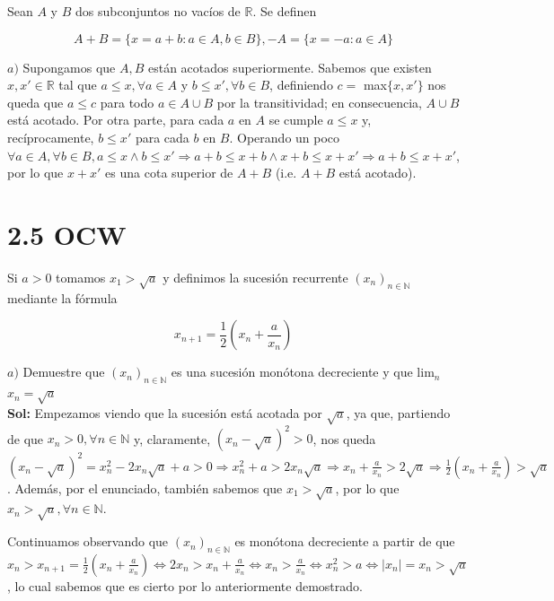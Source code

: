\documentclass{article}
\begin{document}
Sean $A$ y $B$ dos subconjuntos no vacíos de $\mathbb{R}$. Se definen

\[A + B = \{x = a + b : a \in A, b \in B\}, -A = \{x = -a : a \in A\}\]

$a)$ Supongamos que $A, B$ están acotados superiormente. Sabemos que existen $x, x' \in \mathbb{R}$ tal que $a \leq x, \forall a \in A$ y $b \leq x', \forall b \in B$, definiendo $c =$ max$\{x, x'\}$ nos queda que $a \leq c$ para todo $a \in A \cup B$ por la transitividad; en consecuencia, $A \cup B$ está acotado. Por otra parte, para cada $a$ en $A$ se cumple $a \leq x$ y, recíprocamente, $b \leq x'$ para cada $b$ en $B$. Operando un poco $\forall a \in A, \forall b \in B, a \leq x \land b \leq x' \Longrightarrow a + b \leq x + b \land x + b \leq x + x' \Longrightarrow a + b \leq x + x'$, por lo que $x + x'$ es una cota superior de $A + B$ (i.e. $A + B$ está acotado).

\section{2.5 OCW}

Si $a > 0$ tomamos $x_1 > \sqrt{a}$ y definimos la sucesión recurrente $(x_n)_{n \in \mathbb{N}}$ mediante la fórmula

\[x_{n + 1} = \frac{1}{2}\left(x_n + \frac{a}{x_n}\right)\]

$a)$ Demuestre que $(x_n)_{n \in \mathbb{N}}$ es una sucesión monótona decreciente y que lim$_n$ $ x_n = \sqrt{a}$ \\

\textbf{Sol:} Empezamos viendo que la sucesión está acotada por $\sqrt{a}$, ya que, partiendo de que $x_n > 0, \forall n \in \mathbb{N}$ y, claramente, $(x_n - \sqrt{a})^2 > 0$, nos queda $(x_n - \sqrt{a})^2 = x_n^2 - 2x_n\sqrt{a} + a > 0 \Longrightarrow x_n^2 + a > 2x_n\sqrt{a} \Longrightarrow x_n + \frac{a}{x_n} > 2\sqrt{a} \Longrightarrow \frac{1}{2}\left(x_n + \frac{a}{x_n}\right) > \sqrt{a}$. Además, por el enunciado, también sabemos que $x_1 > \sqrt{a}$, por lo que $x_n > \sqrt{a}, \forall n \in \mathbb{N}$.

Continuamos observando que $(x_n)_{n \in \mathbb{N}}$ es monótona decreciente a partir de que $x_n > x_{n + 1} = \frac{1}{2}\left(x_n + \frac{a}{x_n}\right) \Longleftrightarrow 2x_n > x_n + \frac{a}{x_n} \Longleftrightarrow x_n > \frac{a}{x_n} \Longleftrightarrow x_n^2 > a \Longleftrightarrow |x_n| = x_n > \sqrt{a}$, lo cual sabemos que es cierto por lo anteriormente demostrado.
\end{document}
